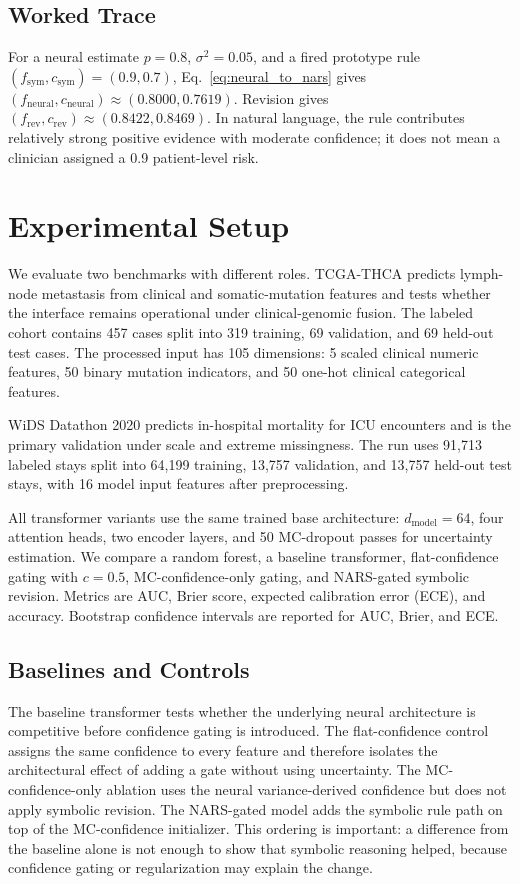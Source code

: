 \documentclass[final]{nesy2026}
\begin{document}
\subsection{Worked Trace}

For a neural estimate $p=0.8$, $\sigma^2=0.05$, and a fired prototype rule $(f_{\text{sym}},c_{\text{sym}})=(0.9,0.7)$, Eq.~\eqref{eq:neural_to_nars} gives $(f_{\text{neural}},c_{\text{neural}})\approx(0.8000,0.7619)$. Revision gives $(f_{\text{rev}},c_{\text{rev}})\approx(0.8422,0.8469)$. In natural language, the rule contributes relatively strong positive evidence with moderate confidence; it does not mean a clinician assigned a 0.9 patient-level risk.

\section{Experimental Setup}
\label{sec:experiments}

We evaluate two benchmarks with different roles. TCGA-THCA predicts lymph-node metastasis from clinical and somatic-mutation features and tests whether the interface remains operational under clinical-genomic fusion. The labeled cohort contains 457 cases split into 319 training, 69 validation, and 69 held-out test cases. The processed input has 105 dimensions: 5 scaled clinical numeric features, 50 binary mutation indicators, and 50 one-hot clinical categorical features.

WiDS Datathon 2020 predicts in-hospital mortality for ICU encounters and is the primary validation under scale and extreme missingness. The run uses 91,713 labeled stays split into 64,199 training, 13,757 validation, and 13,757 held-out test stays, with 16 model input features after preprocessing.

All transformer variants use the same trained base architecture: $d_{\text{model}}=64$, four attention heads, two encoder layers, and 50 MC-dropout passes for uncertainty estimation. We compare a random forest, a baseline transformer, flat-confidence gating with $c=0.5$, MC-confidence-only gating, and NARS-gated symbolic revision. Metrics are AUC, Brier score, expected calibration error (ECE), and accuracy. Bootstrap confidence intervals are reported for AUC, Brier, and ECE.

\subsection{Baselines and Controls}

The baseline transformer tests whether the underlying neural architecture is competitive before confidence gating is introduced. The flat-confidence control assigns the same confidence to every feature and therefore isolates the architectural effect of adding a gate without using uncertainty. The MC-confidence-only ablation uses the neural variance-derived confidence but does not apply symbolic revision. The NARS-gated model adds the symbolic rule path on top of the MC-confidence initializer. This ordering is important: a difference from the baseline alone is not enough to show that symbolic reasoning helped, because confidence gating or regularization may explain the change.
\end{document}
